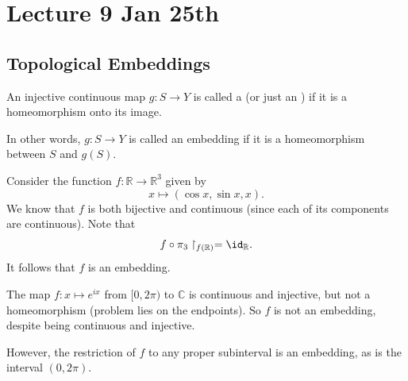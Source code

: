 \documentclass[notoc,notitlepage]{tufte-book}
\begin{document}


\chapter{Lecture 9 Jan 25th}%
\label{chp:lecture_9_jan_25th}

\section{Topological Embeddings}%
\label{sec:topological_embeddings}

\begin{defn}\label{defn:topological_embedding}
  An injective continuous map $g : S \to Y$ is called a  (or just
  an ) if it is a homeomorphism onto its image.
\end{defn}

\begin{note}
  In other words, $g : S \to Y$ is called an embedding if it is a homeomorphism between $S$ and
  $g(S)$.
\end{note}

\begin{eg}
  Consider the function $f : \mathbb{R} \to \mathbb{R}^3$ given by
  \begin{equation*}
    x \mapsto (\cos x, \sin x, x).
  \end{equation*}
  We know that $f$ is both bijective and continuous (since each of its components are continuous).
  Note that
  \begin{equation*}
    f \circ \pi_3 \restriction_{f(\mathbb{R})} = \id_{\mathbb{R}}.
  \end{equation*}
  It follows that $f$ is an embedding.
\end{eg}

\begin{eg}
  The map $f : x \mapsto e^{ix}$ from $[0, 2 \pi)$ to $\mathbb{C}$ is continuous and injective, but
  not a homeomorphism (problem lies on the endpoints). So $f$ is not an embedding, despite being
  continuous and injective.

  However, the restriction of $f$ to any proper subinterval is an embedding, as is the interval
  $(0, 2 \pi)$.
\end{eg}
\end{document}
